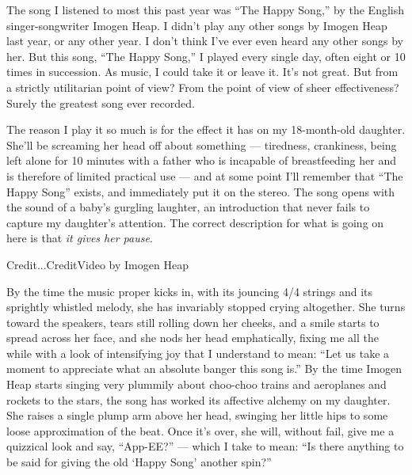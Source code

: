 The song I listened to most this past year was ``The Happy Song,'' by
the English singer-songwriter Imogen Heap. I didn't play any other songs
by Imogen Heap last year, or any other year. I don't think I've ever
even heard any other songs by her. But this song, ``The Happy Song,'' I
played every single day, often eight or 10 times in succession. As
music, I could take it or leave it. It's not great. But from a strictly
utilitarian point of view? From the point of view of sheer
effectiveness? Surely the greatest song ever recorded.

The reason I play it so much is for the effect it has on my 18-month-old
daughter. She'll be screaming her head off about something ---
tiredness, crankiness, being left alone for 10 minutes with a father who
is incapable of breastfeeding her and is therefore of limited practical
use --- and at some point I'll remember that ``The Happy Song'' exists,
and immediately put it on the stereo. The song opens with the sound of a
baby's gurgling laughter, an introduction that never fails to capture my
daughter's attention. The correct description for what is going on here
is that \emph{it gives her pause}.

Credit...CreditVideo by Imogen Heap

By the time the music proper kicks in, with its jouncing 4/4 strings and
its sprightly whistled melody, she has invariably stopped crying
altogether. She turns toward the speakers, tears still rolling down her
cheeks, and a smile starts to spread across her face, and she nods her
head emphatically, fixing me all the while with a look of intensifying
joy that I understand to mean: ``Let us take a moment to appreciate what
an absolute banger this song is.'' By the time Imogen Heap starts
singing very plummily about choo-choo trains and aeroplanes and rockets
to the stars, the song has worked its affective alchemy on my daughter.
She raises a single plump arm above her head, swinging her little hips
to some loose approximation of the beat. Once it's over, she will,
without fail, give me a quizzical look and say, ``App-EE?'' --- which I
take to mean: ``Is there anything to be said for giving the old `Happy
Song' another spin?''

